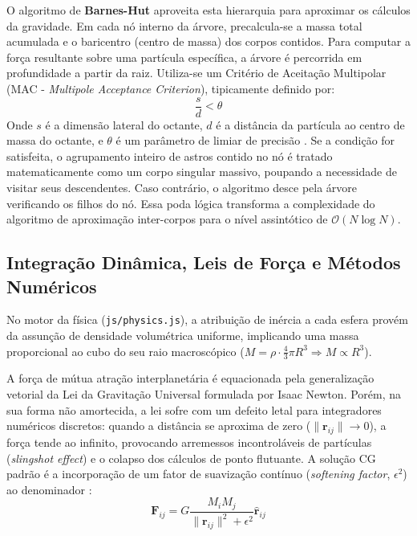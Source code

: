 \documentclass[11pt,a4paper]{article}
\begin{document}
O algoritmo de \textbf{Barnes-Hut} aproveita esta hierarquia para aproximar os cálculos da gravidade. Em cada nó interno da árvore, precalcula-se a massa total acumulada e o baricentro (centro de massa) dos corpos contidos. Para computar a força resultante sobre uma partícula específica, a árvore é percorrida em profundidade a partir da raiz. Utiliza-se um Critério de Aceitação Multipolar (MAC - \textit{Multipole Acceptance Criterion}), tipicamente definido por:
\begin{equation}
    \frac{s}{d} < \theta
\end{equation}
Onde $s$ é a dimensão lateral do octante, $d$ é a distância da partícula ao centro de massa do octante, e $\theta$ é um parâmetro de limiar de precisão \cite{hockney}. Se a condição for satisfeita, o agrupamento inteiro de astros contido no nó é tratado matematicamente como um corpo singular massivo, poupando a necessidade de visitar seus descendentes. Caso contrário, o algoritmo desce pela árvore verificando os filhos do nó. Essa poda lógica transforma a complexidade do algoritmo de aproximação inter-corpos para o nível assintótico de $\mathcal{O}(N \log N)$.

\subsection{Integração Dinâmica, Leis de Força e Métodos Numéricos}

No motor da física (\texttt{js/physics.js}), a atribuição de inércia a cada esfera provém da assunção de densidade volumétrica uniforme, implicando uma massa proporcional ao cubo do seu raio macroscópico ($M = \rho \cdot \frac{4}{3}\pi R^3 \Rightarrow M \propto R^3$). 

A força de mútua atração interplanetária é equacionada pela generalização vetorial da Lei da Gravitação Universal formulada por Isaac Newton. Porém, na sua forma não amortecida, a lei sofre com um defeito letal para integradores numéricos discretos: quando a distância se aproxima de zero ($\|\mathbf{r}_{ij}\| \to 0$), a força tende ao infinito, provocando arremessos incontroláveis de partículas (\textit{slingshot effect}) e o colapso dos cálculos de ponto flutuante. A solução CG padrão é a incorporação de um fator de suavização contínuo (\textit{softening factor}, $\epsilon^2$) ao denominador \cite{hockney}:
\begin{equation}
    \mathbf{F}_{ij} = G \frac{M_i M_j}{\|\mathbf{r}_{ij}\|^2 + \epsilon^2} \hat{\mathbf{r}}_{ij}
\end{equation}
\end{document}
